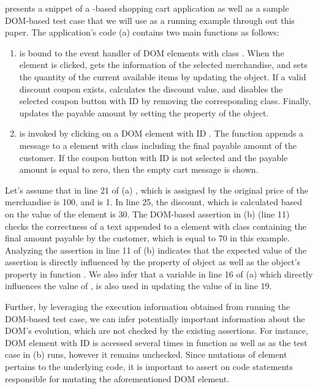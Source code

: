 presents a snippet of a \javascript-based shopping cart application as well as a sample DOM-based \selenium test case that we will use as a running example through out this paper. The application's code (a) contains two main functions as follows:
\begin{enumerate}
\item {} is bound to the event handler of DOM elements with class . When the element is clicked,  gets the information of the selected merchandise, and sets the quantity of the current available items by updating the  object. If a valid discount coupon exists,  calculates the discount value, and disables the selected  coupon button with ID  by removing the corresponding class. Finally,  updates the payable amount by setting the  property of the  object.
\item {} is invoked by clicking on a DOM element with ID . The function appends a message to a  element with class  including the final payable amount of the customer. If the  coupon button with ID  is not selected and the payable amount is equal to zero, then the empty cart message is shown.    
\end{enumerate}
Let's assume that in line 21 of (a) , which is assigned by the original price of the merchandise is 100, and  is 1. In line 25, the discount, which is calculated based on the  value of the  element is 30. 
The DOM-based assertion in (b) (line 11) checks the correctness of a text appended to a  element with class  containing the final amount payable by the customer, which is equal to 70 in this example.
Analyzing the assertion in line 11 of (b) indicates that the expected value of the assertion is directly influenced by the  property of  object as well as the object's property  in function . We also infer that a variable in line 16 of (a) which directly influences the value of , is also used in updating the value of  in line 19.

Further, by leveraging the execution information obtained from running the DOM-based test case, we can infer potentially important information about the DOM's evolution, which are not checked by the existing assertions. For instance, DOM element with ID  is accessed several times in function  as well as  as the test case in (b) runs, however it remains unchecked. Since mutations of  element pertains to the underlying \javascript code, it is important to assert on code statements responsible for mutating the aforementioned DOM element.             

